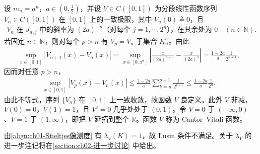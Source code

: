 \documentclass[../../main.tex]{subfiles}%
\begin{document}
设 $m_n=a^n$，$a\in(0,\frac{1}{2})$，并设 $V\in C([0,1])$ 为分段线性函数序列 $V_n\in C([0,1])$ 在 $[0,1]$ 上的一致极限，其中 $V_n(0)\triangleq0$，且
\begin{align*}
V_n\text{ 在 }J_{n,j}\text{ 中的斜率为 }(2a)^{-n}\text{（对每个 }j=1,\cdots ,2^n\text{），在其余处为 }0\quad(n\in\mathbb{N}).
\end{align*}
若固定 $n\in\mathbb{N}$，则对每个 $p>n$ 有 $V_p=V_n$ 于集合 $K_n^c$。由此
\begin{align*}
\sup_{x\in[0,1]}|V_{n+1}(x)-V_n(x)|
=\sup_{x\in[0,a^n]}\left|\frac{x}{(2a)^{n+1}}-\frac{x}{(2a)^n}\right|
=\frac{1-2a}{a}\frac{1}{2^{n+1}},
\end{align*}
因而对任意 $p>n$，
\begin{align*}
\sup_{x\in[0,1]}|V_p(x)-V_n(x)|\leqslant\frac{1-2a}{a}\sum_{k=n}^{p-1}\frac{1}{2^{k+1}}\leqslant\frac{1-2a}{a}\frac{1}{2^n}.
\end{align*}
由此不等式，序列 $\{V_n\}$ 在 $[0,1]$ 上一致收敛，故函数 $V$ 良定义。此外 $V$ 非减，$V(0)=0$，$V(1)=1$，且 $V'=0$ 几乎处处于 $(0,1)$。令 $V=0$ 于 $(-\infty,0)$、$V=1$ 于 $(1,\infty)$，即把 $V$ 延拓到整个 $\mathbb{R}$。函数 $V$ 称为 Cantor--Vitali 函数。

由\eqref{align:ch01-Stieltjes像测度} 有 $\lambda_V(K)=1$，故 Lusin 条件不满足。关于 $\lambda_V$ 的进一步注记将在\cref{section:ch02-进一步讨论} 中给出。
\end{document}
